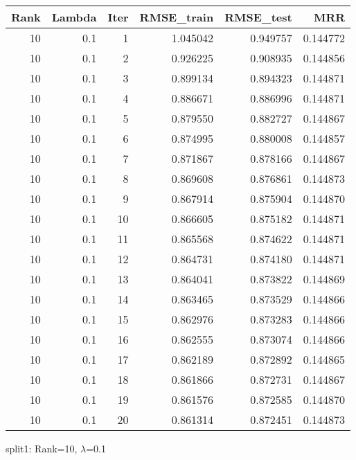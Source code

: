 \begin{tabular}{rrrrrr}
\toprule
 Rank &  Lambda &  Iter &  RMSE\_train &  RMSE\_test &       MRR \\
\midrule
   10 &     0.1 &     1 &    1.045042 &   0.949757 &  0.144772 \\
   10 &     0.1 &     2 &    0.926225 &   0.908935 &  0.144856 \\
   10 &     0.1 &     3 &    0.899134 &   0.894323 &  0.144871 \\
   10 &     0.1 &     4 &    0.886671 &   0.886996 &  0.144871 \\
   10 &     0.1 &     5 &    0.879550 &   0.882727 &  0.144867 \\
   10 &     0.1 &     6 &    0.874995 &   0.880008 &  0.144857 \\
   10 &     0.1 &     7 &    0.871867 &   0.878166 &  0.144867 \\
   10 &     0.1 &     8 &    0.869608 &   0.876861 &  0.144873 \\
   10 &     0.1 &     9 &    0.867914 &   0.875904 &  0.144870 \\
   10 &     0.1 &    10 &    0.866605 &   0.875182 &  0.144871 \\
   10 &     0.1 &    11 &    0.865568 &   0.874622 &  0.144871 \\
   10 &     0.1 &    12 &    0.864731 &   0.874180 &  0.144871 \\
   10 &     0.1 &    13 &    0.864041 &   0.873822 &  0.144869 \\
   10 &     0.1 &    14 &    0.863465 &   0.873529 &  0.144866 \\
   10 &     0.1 &    15 &    0.862976 &   0.873283 &  0.144866 \\
   10 &     0.1 &    16 &    0.862555 &   0.873074 &  0.144866 \\
   10 &     0.1 &    17 &    0.862189 &   0.872892 &  0.144865 \\
   10 &     0.1 &    18 &    0.861866 &   0.872731 &  0.144867 \\
   10 &     0.1 &    19 &    0.861576 &   0.872585 &  0.144870 \\
   10 &     0.1 &    20 &    0.861314 &   0.872451 &  0.144873 \\
\bottomrule
\end{tabular}

\caption{split1: Rank=10, $\lambda$=0.1}

